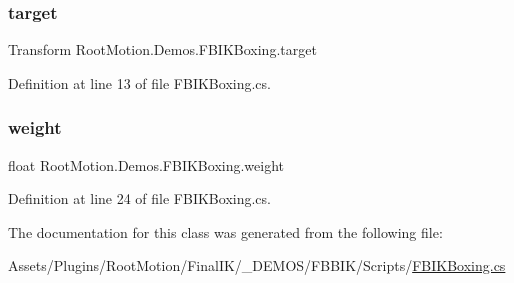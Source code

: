 \subsubsection{\texorpdfstring{target}{target}}
{\footnotesize\ttfamily Transform Root\+Motion.\+Demos.\+F\+B\+I\+K\+Boxing.\+target}



Definition at line 13 of file F\+B\+I\+K\+Boxing.\+cs.

\mbox{\label{class_root_motion_1_1_demos_1_1_f_b_i_k_boxing_a747ebe8c09a32f227e462c0bc373d13d}} 
\subsubsection{\texorpdfstring{weight}{weight}}
{\footnotesize\ttfamily float Root\+Motion.\+Demos.\+F\+B\+I\+K\+Boxing.\+weight}



Definition at line 24 of file F\+B\+I\+K\+Boxing.\+cs.



The documentation for this class was generated from the following file\+:\begin{DoxyCompactItemize}
\item 
Assets/\+Plugins/\+Root\+Motion/\+Final\+I\+K/\+\_\+\+D\+E\+M\+O\+S/\+F\+B\+B\+I\+K/\+Scripts/\mbox{\hyperlink{_f_b_i_k_boxing_8cs}{F\+B\+I\+K\+Boxing.\+cs}}\end{DoxyCompactItemize}
